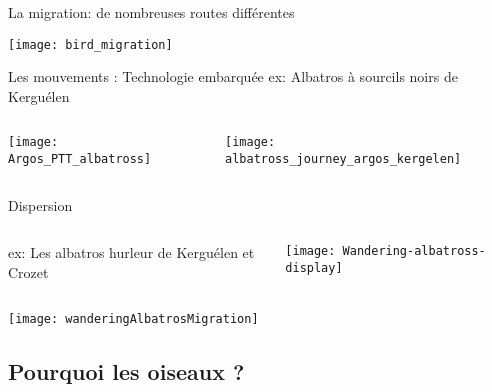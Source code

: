 \documentclass[10pt]{beamer}
\begin{document}
\begin{frame}{La migration: de nombreuses routes différentes}
  \begin{center}
    \texttt{[image: bird\_migration]} 
  \end{center}
\end{frame}


\begin{frame}{Les mouvements : Technologie embarquée}
  ex: Albatros à sourcils noirs de Kerguélen
  \begin{columns}[c]
    \begin{column}[c]{0.4\textwidth}
      \begin{center}
        \texttt{[image: Argos\_PTT\_albatross]}
      \end{center}
    \end{column}
    \begin{column}[c]{0.6\textwidth}
      \begin{center}
        \texttt{[image: albatross\_journey\_argos\_kergelen]}
      \end{center}
    \end{column}
  \end{columns}
\end{frame}




\begin{frame}{Dispersion}
  \begin{columns}[c]
    \begin{column}[c]{0.75\textwidth}
      ex: Les albatros hurleur de Kerguélen et Crozet
    \end{column}
    \begin{column}[c]{0.25\textwidth}
      \texttt{[image: Wandering-albatross-display]} 
    \end{column}
  \end{columns}
  \begin{center}
    \texttt{[image: wanderingAlbatrosMigration]} 
  \end{center}
\end{frame}


\subsection{Pourquoi les oiseaux ?} 
\end{document}

